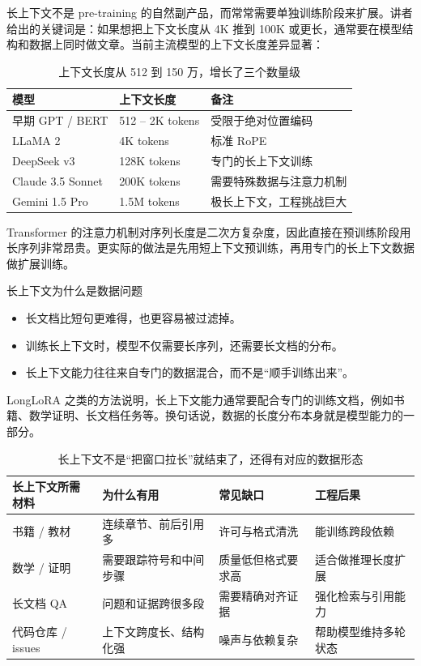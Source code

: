 \documentclass[a4paper]{article}
\begin{document}
长上下文不是 pre-training 的自然副产品，而常常需要单独训练阶段来扩展。讲者给出的关键词是：如果想把上下文长度从 4K 推到 100K 或更长，通常要在模型结构和数据上同时做文章。当前主流模型的上下文长度差异显著：

\begin{table}[H]
\centering
\begin{tabular}{p{}p{}p{}}
\toprule
\textbf{模型} & \textbf{上下文长度} & \textbf{备注} \\
\midrule
早期 GPT / BERT & 512 -- 2K tokens & 受限于绝对位置编码 \\
LLaMA 2 & 4K tokens & 标准 RoPE \\
DeepSeek v3 & 128K tokens & 专门的长上下文训练 \\
Claude 3.5 Sonnet & 200K tokens & 需要特殊数据与注意力机制 \\
Gemini 1.5 Pro & 1.5M tokens & 极长上下文，工程挑战巨大 \\
\bottomrule
\end{tabular}
\caption{上下文长度从 512 到 150 万，增长了三个数量级}
\end{table}

Transformer 的注意力机制对序列长度是二次方复杂度，因此直接在预训练阶段用长序列非常昂贵。更实际的做法是先用短上下文预训练，再用专门的长上下文数据做扩展训练。

\begin{knowledgebox}{长上下文为什么是数据问题}
\begin{itemize}
    \item 长文档比短句更难得，也更容易被过滤掉。
    \item 训练长上下文时，模型不仅需要长序列，还需要长文档的分布。
    \item 长上下文能力往往来自专门的数据混合，而不是“顺手训练出来”。
\end{itemize}
\end{knowledgebox}

LongLoRA 之类的方法说明，长上下文能力通常要配合专门的训练文档，例如书籍、数学证明、长文档任务等。换句话说，数据的长度分布本身就是模型能力的一部分。

\begin{table}[H]
\centering
\begin{tabular}{p{}p{}p{}p{}}
\toprule
\textbf{长上下文所需材料} & \textbf{为什么有用} & \textbf{常见缺口} & \textbf{工程后果} \\
\midrule
书籍 / 教材 & 连续章节、前后引用多 & 许可与格式清洗 & 能训练跨段依赖 \\
数学 / 证明 & 需要跟踪符号和中间步骤 & 质量低但格式要求高 & 适合做推理长度扩展 \\
长文档 QA & 问题和证据跨很多段 & 需要精确对齐证据 & 强化检索与引用能力 \\
代码仓库 / issues & 上下文跨度长、结构化强 & 噪声与依赖复杂 & 帮助模型维持多轮状态 \\
\bottomrule
\end{tabular}
\caption{长上下文不是“把窗口拉长”就结束了，还得有对应的数据形态}
\end{table}
\end{document}
